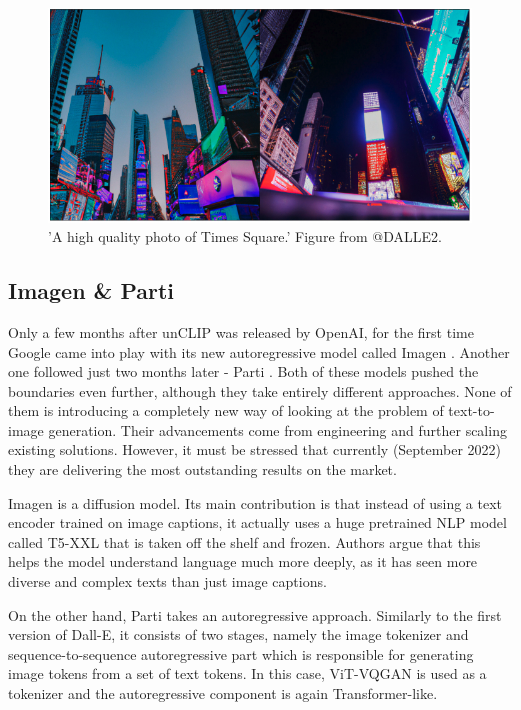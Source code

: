\documentclass[
]{krantz}
\begin{document}
\begin{figure}

{\centering \includegraphics[width=1\linewidth]{figures/02-02-text-2-img/timessquare} 

}

\caption{'A high quality photo of Times Square.' Figure from @DALLE2.}\label{fig:timessquare}
\end{figure}

\hypertarget{imagen-parti}{%
\subsection{Imagen \& Parti}\label{imagen-parti}}

Only a few months after unCLIP was released by OpenAI, for the first time Google came into play with its new autoregressive model called Imagen \citep{Imagen2022}. Another one followed just two months later - Parti \citep{Parti2022}. Both of these models pushed the boundaries even further, although they take entirely different approaches. None of them is introducing a completely new way of looking at the problem of text-to-image generation. Their advancements come from engineering and further scaling existing solutions. However, it must be stressed that currently (September 2022) they are delivering the most outstanding results on the market.

Imagen is a diffusion model. Its main contribution is that instead of using a text encoder trained on image captions, it actually uses a huge pretrained NLP model called T5-XXL \citep{T5XXL2019} that is taken off the shelf and frozen. Authors argue that this helps the model understand language much more deeply, as it has seen more diverse and complex texts than just image captions.

On the other hand, Parti takes an autoregressive approach. Similarly to the first version of Dall-E, it consists of two stages, namely the image tokenizer and sequence-to-sequence autoregressive part which is responsible for generating image tokens from a set of text tokens. In this case, ViT-VQGAN \citep{VitVQGAN2021} is used as a tokenizer and the autoregressive component is again Transformer-like.
\end{document}
